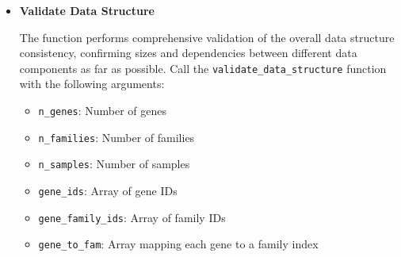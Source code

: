 \begin{enumerate}
\begin{itemize}
                  The function validates that all strings in an array are unique, using
                  a hashset internally. Note: This may increase memory usage temporarily
                  for large datasets. Call the \texttt{validate\_string\_array\_uniqueness}
                  function with the following arguments:
                  
                  \begin{itemize}
                    \item \texttt{strings}: Array of strings to validate (typically gene
                          IDs or family IDs)
                  \end{itemize}
                  
                  \begin{lstlisting}[language=Python, caption={Python Validate String Array Uniqueness}]
validate_string_array_uniqueness(strings)
                  \end{lstlisting}
                  
            \item \textbf{Validate Data Structure}
                  
                  The function performs comprehensive validation of the overall data structure
                  consistency, confirming sizes and dependencies between different data
                  components as far as possible. Call the \texttt{validate\_data\_structure}
                  function with the following arguments:
                  
                  \begin{itemize}
                    \item \texttt{n\_genes}: Number of genes
                          
                    \item \texttt{n\_families}: Number of families
                          
                    \item \texttt{n\_samples}: Number of samples
                          
                    \item \texttt{gene\_ids}: Array of gene IDs
                          
                    \item \texttt{gene\_family\_ids}: Array of family IDs
                          
                    \item \texttt{gene\_to\_fam}: Array mapping each gene to a family index
                          

\end{itemize}
\end{itemize}
\end{enumerate}

